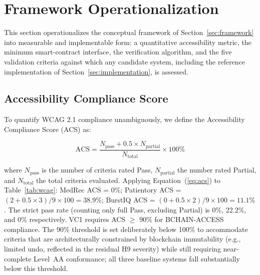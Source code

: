\documentclass[journal,onecolumn]{IEEEtran}
\begin{document}
\section{Framework Operationalization}
\label{sec:operationalization}

This section operationalizes the conceptual framework of Section~\ref{sec:framework} into measurable and implementable form: a quantitative accessibility metric, the minimum smart-contract interface, the verification algorithm, and the five validation criteria against which any candidate system, including the reference implementation of Section~\ref{sec:implementation}, is assessed.

\subsection{Accessibility Compliance Score}

To quantify WCAG 2.1 compliance unambiguously, we define the Accessibility Compliance Score (ACS) as:

\begin{equation}
\text{ACS} = \frac{N_{\text{pass}} + 0.5 \times N_{\text{partial}}}{N_{\text{total}}} \times 100\%
\label{eq:acs}
\end{equation}

\noindent where $N_{\text{pass}}$ is the number of criteria rated Pass, $N_{\text{partial}}$ the number rated Partial, and $N_{\text{total}}$ the total criteria evaluated. Applying Equation~(\ref{eq:acs}) to Table~\ref{tab:wcag}: MedRec ACS = 0\%; Patientory ACS = $(2 + 0.5\times3)/9 \times 100 = 38.9\%$; BurstIQ ACS = $(0 + 0.5\times2)/9 \times 100 = 11.1\%$. The strict pass rate (counting only full Pass, excluding Partial) is 0\%, 22.2\%, and 0\% respectively. VC1 requires ACS $\geq$ 90\% for BCHAIN-ACCESS compliance. The 90\% threshold is set deliberately below 100\% to accommodate criteria that are architecturally constrained by blockchain immutability (e.g., limited undo, reflected in the residual H9 severity) while still requiring near-complete Level~AA conformance; all three baseline systems fall substantially below this threshold.
\end{document}
